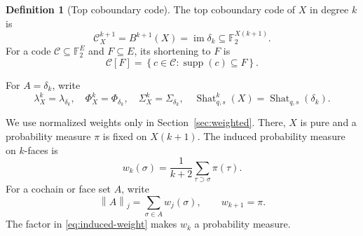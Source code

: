 \documentclass[11pt,letterpaper]{article}
\theoremstyle{plain}
\theoremstyle{definition}
\newtheorem{definition}[theorem]{Definition}
\newcommand{\F}{\mathbb{F}_2}
\newcommand{\cC}{\mathcal{C}}
\newcommand{\supp}{\operatorname{supp}}
\newcommand{\im}{\operatorname{im}}
\newcommand{\Shat}{\operatorname{Shat}}
\newcommand{\1}{\mathbf{1}}
\newcommand{\norm}[1]{\left\lVert#1\right\rVert}
\newcommand{\set}[1]{\left\{#1\right\}}
\begin{document}
\begin{definition}[Top coboundary code]\label{def:top-code}
The top coboundary code of $X$ in degree $k$ is
\[
 \cC_X^{k+1}=B^{k+1}(X)=\im\delta_k
 \subseteq \F^{X(k+1)}.
\]
For a code $\cC\subseteq\F^E$ and $F\subseteq E$, its shortening to $F$ is
\[
 \cC[F]=\set{c\in\cC:\supp(c)\subseteq F}.
\]
\end{definition}

For $A=\delta_k$, write
\begin{equation}\label{eq:simplicial-map-specialization}
 \lambda_X^k=\lambda_{\delta_k},\quad
 \Phi_X^k=\Phi_{\delta_k},\quad
 \Sigma_X^k=\Sigma_{\delta_k},\quad
 \Shat_{q,s}^k(X)=\Shat_{q,s}(\delta_k).
\end{equation}

We use normalized weights only in Section~\ref{sec:weighted}.  There, $X$ is pure and a
probability measure $\pi$ is fixed on $X(k+1)$.  The induced probability measure on
$k$-faces is
\begin{equation}\label{eq:induced-weight}
 w_k(\sigma)=\frac{1}{k+2}\sum_{\tau\supset\sigma}\pi(\tau).
\end{equation}
For a cochain or face set $A$, write
\[
 \norm{A}_j=\sum_{\sigma\in A}w_j(\sigma),
 \qquad w_{k+1}=\pi.
\]
The factor in \eqref{eq:induced-weight} makes $w_k$ a probability measure.
\end{document}
